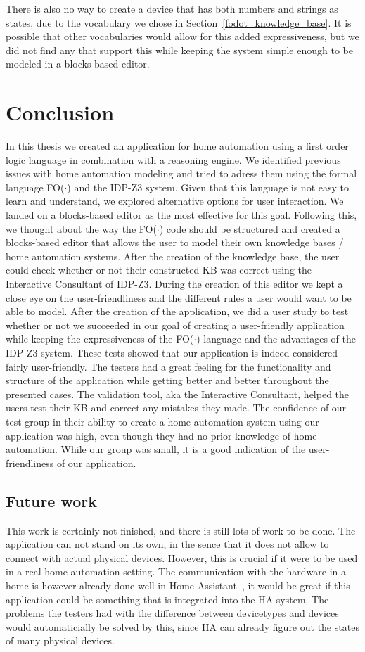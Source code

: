 \documentclass[11pt,a4paper]{report}
\newcommand{\fodot}{FO($\cdot$)\xspace}
\begin{document}
There is also no way to create a device that has both numbers and strings as states, due to the vocabulary we chose in Section~\ref{fodot_knowledge_base}. It is possible that other vocabularies would allow for this added expressiveness, but we did not find any that support this while keeping the system simple enough to be modeled in a blocks-based editor.


\chapter{Conclusion}
In this thesis we created an application for home automation using a first order logic language in combination with a reasoning engine. We identified previous issues with home automation modeling and tried to adress them using the formal language \fodot and the IDP-Z3 system. Given that this language is not easy to learn and understand, we explored alternative options for user interaction. We landed on a blocks-based editor as the most effective for this goal. Following this, we thought about the way the \fodot code should be structured and created a blocks-based editor that allows the user to model their own knowledge bases / home automation systems. After the creation of the knowledge base, the user could check whether or not their constructed KB was correct using the Interactive Consultant of IDP-Z3. During the creation of this editor we kept a close eye on the user-friendliness and the different rules a user would want to be able to model. After the creation of the application, we did a user study to test whether or not we succeeded in our goal of creating a user-friendly application while keeping the expressiveness of the \fodot language and the advantages of the IDP-Z3 system. These tests showed that our application is indeed considered fairly user-friendly. The testers had a great feeling for the functionality and structure of the application while getting better and better throughout the presented cases. The validation tool, aka the Interactive Consultant, helped the users test their KB and correct any mistakes they made. The confidence of our test group in their ability to create a home automation system using our application was high, even though they had no prior knowledge of home automation. While our group was small, it is a good indication of the user-friendliness of our application.

\section{Future work}
This work is certainly not finished, and there is still lots of work to be done. The application can not stand on its own, in the sence that it does not allow to connect with actual physical devices. However, this is crucial if it were to be used in a real home automation setting. The communication with the hardware in a home is however already done well in Home Assistant~\cite{HA}, it would be great if this application could be something that is integrated into the HA system. The problems the testers had with the difference between devicetypes and devices would automaticially be solved by this, since HA can already figure out the states of many physical devices.
\end{document}
